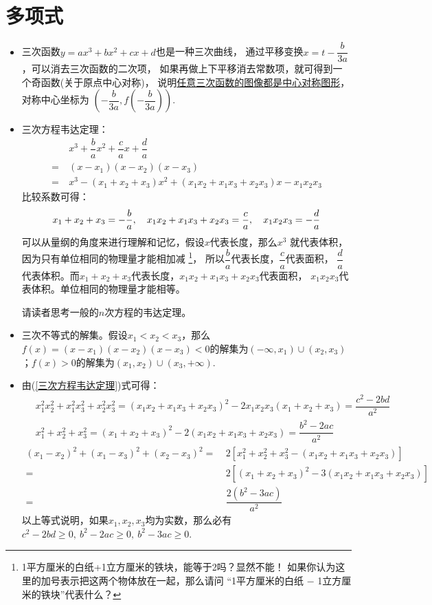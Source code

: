 \section{多项式}
\begin{itemize}[leftmargin=\inteval{\myitemleftmargin}pt,itemsep=
   \inteval{\myitemitempsep}pt,topsep=\inteval{\myitemtopsep}pt]
\item 三次函数$ y=ax^3+bx^2+cx+d $也是一种三次曲线，
通过平移变换$ x=t-\dfrac{b}{3a} $，可以消去三次函数的二次项，
如果再做上下平移消去常数项，就可得到一个奇函数(关于原点中心对称)，
说明\underline{任意三次函数的图像都是中心对称图形}，对称中心坐标为 
$ \left(-\dfrac{b}{3a},f\left(-\dfrac{b}{3a}\right)\right) $. 

\item 三次方程韦达定理：
\begin{align*}
     &\ x^3+\dfrac{b}{a}x^2+\dfrac{c}{a}x+\dfrac{d}{a} \\
    =&\ (x-x_1)(x-x_2)(x-x_3) \\
    =&\ x^3-(x_1+x_2+x_3)x^2+(x_1x_2+x_1x_3+x_2x_3)x-x_1x_2x_3
\end{align*}
比较系数可得：
\begin{align}\label{三次方程韦达定理}
    x_1+x_2+x_3=-\dfrac{b}{a},\quad x_1x_2+x_1x_3+x_2x_3=\dfrac{c}{a},\quad 
    x_1x_2x_3=-\dfrac{d}{a}
\end{align}
可以从量纲的角度来进行理解和记忆，假设$ x $代表长度，那么$ x^3 $
就代表体积，因为只有单位相同的物理量才能相加减
\footnote{1平方厘米的白纸+1立方厘米的铁块，能等于2吗？显然不能！
如果你认为这里的加号表示把这两个物体放在一起，那么请问
“1平方厘米的白纸 $ - $ 1立方厘米的铁块”代表什么？}，
所以$ \dfrac{b}{a} $代表长度，$ \dfrac{c}{a} $代表面积，
$ \dfrac{d}{a} $代表体积。而$ x_1+x_2+x_3 $代表长度，$ x_1x_2+x_1x_3+x_2x_3 $代表面积，
$ x_1x_2x_3 $代表体积。单位相同的物理量才能相等。

请读者思考一般的$ n $次方程的韦达定理。

\item 三次不等式的解集。假设$ x_1<x_2<x_3 $，那么$ f(x)=(x-x_1)(x-x_2)(x-x_3)
<0 $的解集为$ (-\infty,x_1)\cup (x_2,x_3) $；$ f(x)>0 $的解集为$ (x_1,x_2)\cup
(x_3,+\infty) $. 

\item 由(\ref{三次方程韦达定理})式可得：
\begin{align*}
    &\ x_1^2x_2^2+x_1^2x_3^2+x_2^2x_3^2 
    =(x_1x_2+x_1x_3+x_2x_3)^2- 2x_1x_2x_3(x_1+x_2+x_3)
    = \dfrac{c^2-2bd}{a^2} \\
    &\ x_1^2+x_2^2+x_3^2 
    = (x_1+x_2+x_3)^2-2(x_1x_2+x_1x_3+x_2x_3) 
    = \dfrac{b^2-2ac}{a^2} 
\end{align*}
\begin{align*}
    (x_1-x_2)^2+(x_1-x_3)^2+(x_2-x_3)^2 
    =&\  2[x_1^2+x_2^2+x_3^2-(x_1x_2+x_1x_3 +x_2x_3)]\\ 
    =&\  2[(x_1+x_2+x_3)^2-3(x_1x_2+x_1x_3+x_2x_3)] \\
    =&\ \dfrac{2(b^2-3ac)}{a^2}
\end{align*}
以上等式说明，如果$ x_1,x_2,x_3 $均为实数，那么必有
$ c^2-2bd\geq 0,\ b^2-2ac \geq 0,\ b^2-3ac \geq 0 $. 


\end{itemize}
